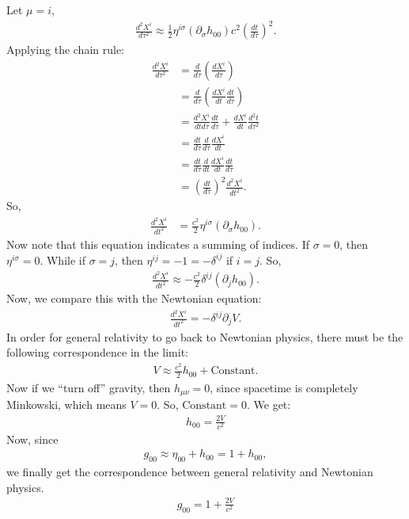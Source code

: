 \documentclass{book}
\theoremstyle{definition}
\begin{document}
Let $\mu = i$,
\begin{align*}
\frac{d^2X^i}{d\tau^2} \approx \frac{1}{2}\eta^{i\sigma}\left(\partial_\sigma h_{00}\right)c^2\left(\frac{dt}{d\tau} \right)^2. 
\end{align*}
Applying the chain rule:
\begin{align*}
\frac{d^2X^i}{d\tau^2} &= \frac{d}{d\tau}\left(\frac{dX^i}{d\tau} \right) \\
&= \frac{d}{d\tau}\left(\frac{dX^i}{dt}\frac{dt}{d\tau} \right)  \\
&= \frac{d^2X^i}{dtd\tau}\frac{dt}{d\tau} + \frac{dX^i}{dt}\frac{d^2t}{d\tau^2}\\
&= \frac{dt}{d\tau}\frac{d}{d\tau}\frac{dX^i}{dt}\\
&= \frac{dt}{d\tau}\frac{d}{dt}\frac{dX^i}{dt}\frac{dt}{d\tau}\\
&= \left( \frac{dt}{d\tau}\right)^2\frac{d^2X^i}{dt^2}.
\end{align*}
So,
\begin{align*}
\frac{d^2X^i}{dt^2} &= \frac{c^2}{2}\eta^{i\sigma}\left(\partial_\sigma h_{00} \right). 
\end{align*}
Now note that this equation indicates a summing of indices. If $\sigma = 0$, then $\eta^{i\sigma} = 0$. While if $\sigma = j$, then $\eta^{ij} = -1 = -\delta^{ij}$ if $i=j$. So,
\begin{align*}
\frac{d^2X^i}{dt^2} \approx -\frac{c^2}{2}\delta^{ij}\left(\partial_j h_{00} \right).
\end{align*}
Now, we compare this with the Newtonian equation:
\begin{align*}
\frac{d^2X^i}{dt^2} = -\delta^{ij}\partial_jV.
\end{align*}
In order for general relativity to go back to Newtonian physics, there must be the following correspondence in the limit:
\begin{align*}
V \approx \frac{c^2}{2}h_{00} + \text{Constant}.
\end{align*}
Now if we ``turn off'' gravity, then $h_{\mu\nu} = 0$, since spacetime is completely Minkowski, which means $V = 0$. So, $\text{Constant} = 0$. We get:
\begin{align*}
\boxed{h_{00} = \frac{2V}{c^2}}
\end{align*} 
Now, since 
\begin{align*}
g_{00} \approx \eta_{00} + h_{00} = 1 + h_{00},
\end{align*}
we finally get the correspondence between general relativity and Newtonian physics. 
\begin{align*}
\boxed{g_{00} = 1 + \frac{2V}{c^2}}
\end{align*}
\end{document}
